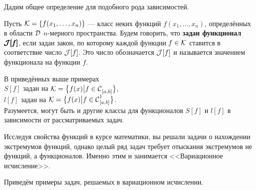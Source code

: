 \noindent Дадим общее определение для подобного рода зависимостей.
\begin{Def}
	Пусть $\mc{K}=\{f(x_1,\ldots,x_n)\}$ --- класс {\mb неких} функций $f(x_1,\ldots,x_n)$, определённых в области $\mc{D}$ $n$-мерного пространства. Будем говорить, что \textbf{задан функционал $\pmb{\J[f]}$}, если задан закон, по которому каждой функции $f\in\mc{K}$ ставится в соответствие число $\J[f]$. Это число обозначается $\J[f]$ и называется значением функционала на функции $f$.
\end{Def}

\noindent В приведённых выше примерах \\
\indent$S[f]$ задан на $\mc{K}=\big\{f(x)\big|f\in \Cfn[{[a,b]}]{}\big\}$,\\
\indent $l[f]$ задан на $\mc{K}=\big\{f(x)\big|f\in \Cfn[{[a,b]}]{1}\big\}$.\\
Разумеется, могут быть и другие классы для функционалов $S[f]$ и $l[f]$ в зависимости от рассматриваемых задач.

Исследуя свойства функций в курсе математики, вы решали задачи о нахождении экстремумов функций, однако целый ряд задач требует отыскания экстремумов не функций, а функционалов. Именно этим и занимается <<Вариационное исчисление>>.
\vspace{0.25cm}

Приведём примеры задач, решаемых в вариационном исчислении.

